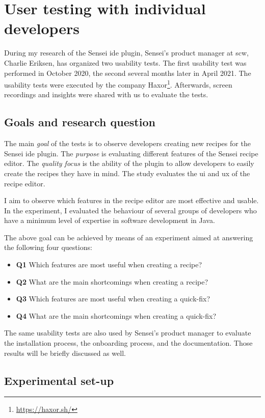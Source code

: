 \section{User testing with individual developers}
\label{sec:user-testing}
During my research of the Sensei \gls{ide} plugin, Sensei's product manager at \gls{scw}, Charlie Eriksen, has organized two usability tests.
The first usability test was performed in October 2020, the second several months later in April 2021.
The usability tests were executed by the company Haxor\footnote{\url{https://haxor.sh/}}.
Afterwards, screen recordings and insights were shared with us to evaluate the tests.

\subsection{Goals and research question}
The main \textit{goal} of the tests is to observe developers creating new recipes for the Sensei \gls{ide} plugin.
The \textit{purpose} is evaluating different features of the Sensei recipe editor.
The \textit{quality focus} is the ability of the plugin to allow developers to easily create the recipes they have in mind.
The study evaluates the \gls{ui} and \gls{ux} of the recipe editor.

I aim to observe which features in the recipe editor are most effective and usable.
In the experiment, I evaluated the behaviour of several groups of developers who have a minimum level of expertise in software development in Java.

The above goal can be achieved by means of an experiment aimed at answering the following four questions:
\begin{itemize}
    \item \textbf{Q1} Which features are most useful when creating a recipe?
    \item \textbf{Q2} What are the main shortcomings when creating a recipe?
    \item \textbf{Q3} Which features are most useful when creating a quick-fix?
    \item \textbf{Q4} What are the main shortcomings when creating a quick-fix?
\end{itemize}

The same usability tests are also used by Sensei's product manager to evaluate the installation process, the onboarding process, and the documentation.
Those results will be briefly discussed as well.

\subsection{Experimental set-up}
